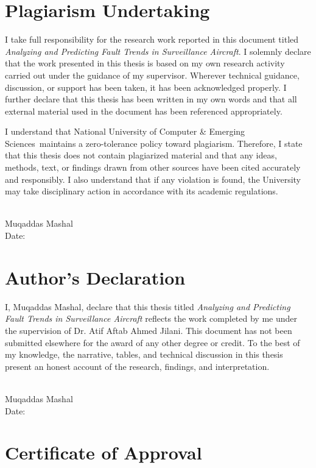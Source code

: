 \documentclass[12pt,a4paper]{report}
\newcommand{\ProjectTitle}{Analyzing and Predicting Fault Trends in Surveillance Aircraft}
\newcommand{\StudentName}{Muqaddas Mashal}
\newcommand{\SupervisorName}{Dr. Atif Aftab Ahmed Jilani}
\newcommand{\UniversityName}{National University of Computer \& Emerging Sciences}
\newcommand{\signatureline}[1]{%
	\vspace{2cm}
	\begin{flushright}
		\noindent\makebox[2.5in]{\hrulefill}\\[0.3em]
		\noindent #1\\[1.5em]
		\noindent Date: \makebox[2.0in]{\hrulefill}
	\end{flushright}
}
\begin{document}
	\hypersetup{pageanchor=true}
	\setcounter{page}{2}
	
	\chapter*{Plagiarism Undertaking}
	
	I take full responsibility for the research work reported in this document titled \emph{\ProjectTitle}. I solemnly declare that the work presented in this thesis is based on my own research activity carried out under the guidance of my supervisor. Wherever technical guidance, discussion, or support has been taken, it has been acknowledged properly. I further declare that this thesis has been written in my own words and that all external material used in the document has been referenced appropriately.
	
	I understand that \UniversityName\ maintains a zero-tolerance policy toward plagiarism. Therefore, I state that this thesis does not contain plagiarized material and that any ideas, methods, text, or findings drawn from other sources have been cited accurately and responsibly. I also understand that if any violation is found, the University may take disciplinary action in accordance with its academic regulations.
	
	\signatureline{\StudentName}
	
	\chapter*{Author's Declaration}
	
	I, \StudentName, declare that this thesis titled \emph{\ProjectTitle} reflects the work completed by me under the supervision of \SupervisorName. This document has not been submitted elsewhere for the award of any other degree or credit. To the best of my knowledge, the narrative, tables, and technical discussion in this thesis present an honest account of the research, findings, and interpretation.
	
	\signatureline{\StudentName}
	
	\chapter*{Certificate of Approval}
	
\end{document}
